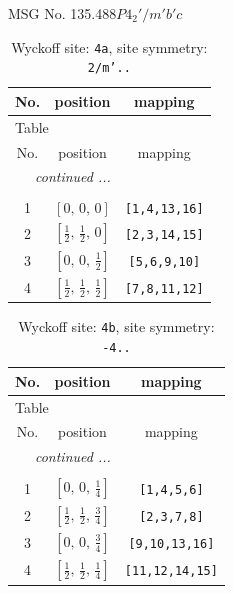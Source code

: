\documentclass[fleqn,8pt]{jsarticle}
\begin{document}
\setcounter{MaxMatrixCols}{32}

\renewcommand{\tablename}{Table~}
\renewcommand{\figurename}{Figure~}
\begin{center}
\LARGE
MSG No. 135.488\quad$P4_{2}'/m'b'c$
\end{center}
\renewcommand{\arraystretch}{1.2}
\begin{longtable}{ccc}
\caption{Wyckoff site: {\tt 4a}, site symmetry: {\tt 2/m'..}}
 \\
 \hline \hline
No. & position & mapping \\ \hline \endfirsthead

\multicolumn{2}{l}{\tablename\ \thetable{}} \\
 \hline \hline
No. & position & mapping \\ \hline \endhead

 \hline \hline
\multicolumn{2}{r}{\footnotesize\it continued ...} \\ \endfoot

 \hline \hline
\multicolumn{2}{r}{} \\ \endlastfoot

1 & $\left[ 0,\, 0,\, 0 \right]$ & {\tt [1,4,13,16]} \\ \hline
2 & $\left[ \frac{1}{2},\, \frac{1}{2},\, 0 \right]$ & {\tt [2,3,14,15]} \\ \hline
3 & $\left[ 0,\, 0,\, \frac{1}{2} \right]$ & {\tt [5,6,9,10]} \\ \hline
4 & $\left[ \frac{1}{2},\, \frac{1}{2},\, \frac{1}{2} \right]$ & {\tt [7,8,11,12]} \\
\end{longtable}
\renewcommand{\arraystretch}{1.2}
\begin{longtable}{ccc}
\caption{Wyckoff site: {\tt 4b}, site symmetry: {\tt -4..}}
 \\
 \hline \hline
No. & position & mapping \\ \hline \endfirsthead

\multicolumn{2}{l}{\tablename\ \thetable{}} \\
 \hline \hline
No. & position & mapping \\ \hline \endhead

 \hline \hline
\multicolumn{2}{r}{\footnotesize\it continued ...} \\ \endfoot

 \hline \hline
\multicolumn{2}{r}{} \\ \endlastfoot

1 & $\left[ 0,\, 0,\, \frac{1}{4} \right]$ & {\tt [1,4,5,6]} \\ \hline
2 & $\left[ \frac{1}{2},\, \frac{1}{2},\, \frac{3}{4} \right]$ & {\tt [2,3,7,8]} \\ \hline
3 & $\left[ 0,\, 0,\, \frac{3}{4} \right]$ & {\tt [9,10,13,16]} \\ \hline
4 & $\left[ \frac{1}{2},\, \frac{1}{2},\, \frac{1}{4} \right]$ & {\tt [11,12,14,15]} \\
\end{longtable}
\end{document}
